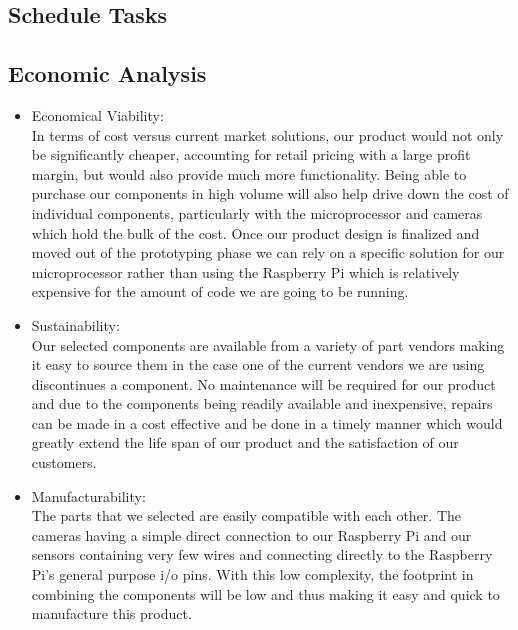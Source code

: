 \documentclass[letterpaper,12pt]{article}
\begin{document}




\subsection{Schedule Tasks}

\subsection{Economic Analysis}
\begin{itemize}
    \item Economical Viability:\\
        In terms of cost versus current market solutions, our product would not only be significantly cheaper, accounting for retail pricing with a large profit margin, but would also provide much more functionality. Being able to purchase our components in high volume will also help drive down the cost of individual components, particularly with the microprocessor and cameras which hold the bulk of the cost. Once our product design is finalized and moved out of the prototyping phase we can rely on a specific solution for our microprocessor rather than using the Raspberry Pi which is relatively expensive for the amount of code we are going to be running.
    \par
    
    \item Sustainability:\\
        Our selected components are available from a variety of part vendors making it easy to source them in the case one of the current vendors we are using discontinues a component. No maintenance will be required for our product and due to the components being readily available and inexpensive, repairs can be made in a cost effective and be done in a timely manner which would greatly extend the life span of our product and the satisfaction of our customers. 
    \par
    
    
    \item Manufacturability:\\
        The parts that we selected are easily compatible with each other. The cameras having a simple direct connection to our Raspberry Pi and our sensors containing very few wires and connecting directly to the Raspberry Pi's general purpose i/o pins. With this low complexity, the footprint in combining the components will be low and thus making it easy and quick to manufacture this product. 
        
    \par
    
\end{itemize}
\end{document}
